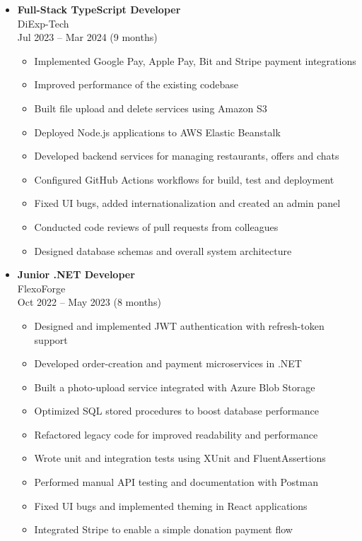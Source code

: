 \begin{itemize}[noitemsep]
    \item \textbf{Full-Stack TypeScript Developer} \\
    DiExp-Tech \\
    Jul 2023 -- Mar 2024 \;(9 months)
    \begin{itemize}[noitemsep]
        \item Implemented Google Pay, Apple Pay, Bit and Stripe payment integrations
        \item Improved performance of the existing codebase
        \item Built file upload and delete services using Amazon S3
        \item Deployed Node.js applications to AWS Elastic Beanstalk
        \item Developed backend services for managing restaurants, offers and chats
        \item Configured GitHub Actions workflows for build, test and deployment
        \item Fixed UI bugs, added internationalization and created an admin panel
        \item Conducted code reviews of pull requests from colleagues
        \item Designed database schemas and overall system architecture
    \end{itemize}

    \item \textbf{Junior .NET Developer} \\
    FlexoForge \\
    Oct 2022 -- May 2023 \;(8 months)
    \begin{itemize}[noitemsep]
        \item Designed and implemented JWT authentication with refresh-token support
        \item Developed order-creation and payment microservices in .NET
        \item Built a photo-upload service integrated with Azure Blob Storage
        \item Optimized SQL stored procedures to boost database performance
        \item Refactored legacy code for improved readability and performance
        \item Wrote unit and integration tests using XUnit and FluentAssertions
        \item Performed manual API testing and documentation with Postman
        \item Fixed UI bugs and implemented theming in React applications
        \item Integrated Stripe to enable a simple donation payment flow
    \end{itemize}
\end{itemize}
